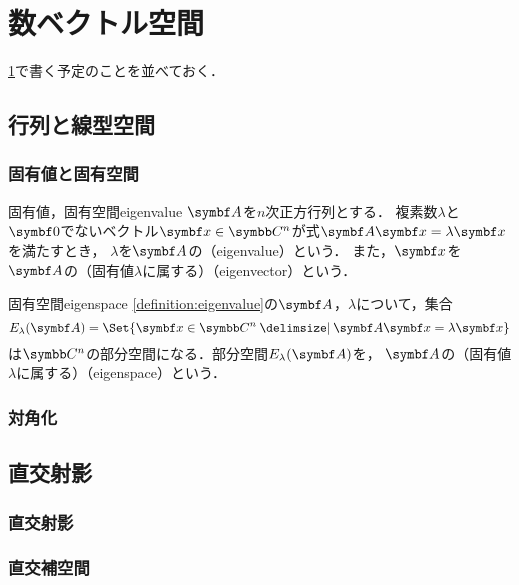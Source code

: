 \documentclass[../../main]{subfiles}
\begin{document}
\chapter{数ベクトル空間}
\label{chapter:numerical_vector_space}

\begin{lead}
  \cref{chapter:numerical_vector_space}で書く予定のことを並べておく．
\end{lead}

\section{行列と線型空間}
\subsection{固有値と固有空間}
\begin{definition}{固有値，固有空間}{eigenvalue}
\(\mat{A}\)を\(n\)次正方行列とする．
複素数\(\lambda\)と\(\zvec\)でないベクトル\(\vect{x}\in\numset{C}^n\)が式\(\mat{A}\vect{x}=\lambda\vect{x}\)を満たすとき，
\(\lambda\)を\(\mat{A}\)の（eigenvalue）という．
また，\(\vect{x}\)を\(\mat{A}\)の（固有値\(\lambda\)に属する）（eigenvector）という．
\end{definition}

\begin{definition}{固有空間}{eigenspace}
\cref{definition:eigenvalue}の\(\mat{A}\)，\(\lambda\)について，集合
\[
  E_\lambda(\mat{A}) = \Set{\vect{x}\in\numset{C}^n\given\mat{A}\vect{x}=\lambda\vect{x}}
\]
は\(\numset{C}^n\)の部分空間になる．部分空間\(E_\lambda(\mat{A})\)を，
\(\mat{A}\)の（固有値\(\lambda\)に属する）（eigenspace）という．
\end{definition}

\subsection{対角化}

\section{直交射影}
\subsection{直交射影}
\subsection{直交補空間}
\end{document}
